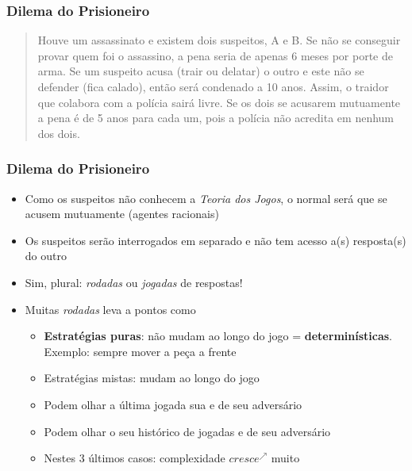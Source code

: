 \begin{frame}

    \frametitle{Dilema do Prisioneiro}
   
    
\begin{quotation}
        Houve um assassinato e existem dois suspeitos, A e B. Se não se conseguir provar quem foi o assassino, a pena seria de apenas 6 meses por porte de arma.
Se um suspeito acusa (trair ou delatar) o outro e este não se defender (fica calado), então  será condenado a 10 anos. Assim, o traidor que colabora com a polícia sairá livre. Se os dois se acusarem mutuamente a pena é de 5 anos para cada um, pois a
polícia não acredita em nenhum dos dois.
    \end{quotation}
    

   
\end{frame}
    
\begin{frame}

    \frametitle{Dilema do Prisioneiro}
   
\begin{itemize}
  
  \item Como os suspeitos não conhecem a \textit{Teoria dos Jogos}, o normal será que se acusem mutuamente (agentes racionais)
    
  \item Os suspeitos serão interrogados em separado e não tem acesso a(s) resposta(s) do outro

\item Sim, plural: \textit{rodadas} ou \textit{jogadas} de respostas!

\item Muitas \textit{rodadas} leva a pontos como

\begin{itemize}
  \item \textbf{Estratégias puras}: não mudam ao longo do jogo = \textbf{determinísticas}. Exemplo: sempre mover a peça a frente
  
  
  \item Estratégias mistas: mudam ao longo do jogo 
  
  \item Podem olhar a última jogada sua e  de seu adversário
  
  \item Podem olhar o seu histórico de jogadas e  de seu adversário
  
  \item Nestes 3 últimos casos: complexidade $cresce^{\nearrow }$ muito
\end{itemize}


\end{itemize}

   
\end{frame}

